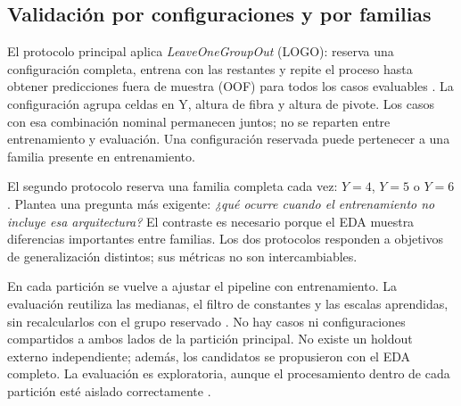 \subsection{Validación por configuraciones y por familias}
El protocolo principal aplica \textit{LeaveOneGroupOut} (LOGO): reserva una configuración completa, entrena con las restantes y repite el proceso hasta obtener predicciones fuera de muestra (OOF) para todos los casos evaluables \cite{sklearnlogo}. La configuración agrupa celdas en Y, altura de fibra y altura de pivote. Los casos con esa combinación nominal permanecen juntos; no se reparten entre entrenamiento y evaluación. Una configuración reservada puede pertenecer a una familia presente en entrenamiento.

El segundo protocolo reserva una familia completa cada vez: $Y=4$, $Y=5$ o $Y=6$. Plantea una pregunta más exigente: \textit{¿qué ocurre cuando el entrenamiento no incluye esa arquitectura?} El contraste es necesario porque el EDA muestra diferencias importantes entre familias. Los dos protocolos responden a objetivos de generalización distintos; sus métricas no son intercambiables.

En cada partición se vuelve a ajustar el pipeline con entrenamiento. La evaluación reutiliza las medianas, el filtro de constantes y las escalas aprendidas, sin recalcularlos con el grupo reservado \cite{sklearnleakage}. No hay casos ni configuraciones compartidos a ambos lados de la partición principal. No existe un holdout externo independiente; además, los candidatos se propusieron con el EDA completo. La evaluación es exploratoria, aunque el procesamiento dentro de cada partición esté aislado correctamente \cite{cawley2010}.

